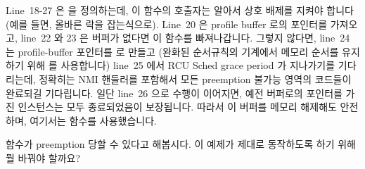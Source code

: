 Line~18-27 은  을 정의하는데, 이 함수의 호출자는 알아서 상호
배제를 지켜야 합니다 (예를 들면, 올바른 락을 잡는식으로).
Line~20 은 profile buffer 로의 포인터를 가져오고, line~22 와 23 은 버퍼가
없다면 이 함수를 빠져나갑니다.
그렇지 않다면, line~24 는 profile-buffer 포인터를  로 만들고 (완화된
순서규칙의 기계에서 메모리 순서를 유지하기 위해  를
사용합니다) line~25 에서 RCU Sched grace period 가 지나가기를 기다리는데,
정확히는 NMI 핸들러를 포함해서 모든 preemption 불가능 영역의 코드들이 완료되길
기다립니다.
일단 line~26 으로 수행이 이어지면, 예전 버퍼로의 포인터를 가진
 인스턴스는 모두 종료되었음이 보장됩니다.
따라서 이 버퍼를 메모리 해제해도 안전하며, 여기서는  함수를
사용했습니다.

\QuickQuiz{}
	 함수가 preemption 당할 수 있다고 해봅시다.
	이 예제가 제대로 동작하도록 하기 위해 뭘 바꿔야 할까요?
	\iffalse

